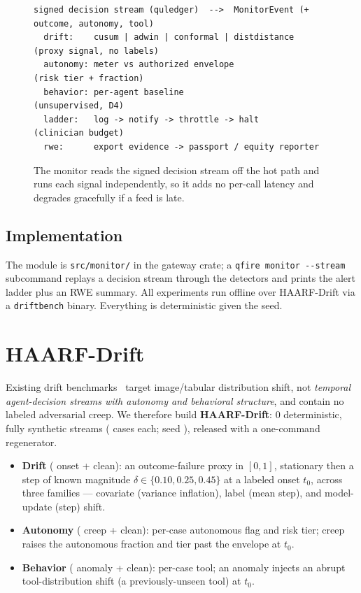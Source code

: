 \documentclass[11pt]{article}
\providecommand{\NumPrompts}{0}
\begin{document}
\begin{figure}[htb]\centering
\begin{tcolorbox}[policycard, cardcol=cardteal, title=The monitor as an off-hot-path
  consumer, width=0.86\linewidth]
\begin{lstlisting}[style=housespecyamlbare]
signed decision stream (quledger)  -->  MonitorEvent (+ outcome, autonomy, tool)
  drift:    cusum | adwin | conformal | distdistance   (proxy signal, no labels)
  autonomy: meter vs authorized envelope               (risk tier + fraction)
  behavior: per-agent baseline                         (unsupervised, D4)
  ladder:   log -> notify -> throttle -> halt          (clinician budget)
  rwe:      export evidence -> passport / equity reporter
\end{lstlisting}
\end{tcolorbox}
\caption{The monitor reads the signed decision stream off the hot path and runs each
signal independently, so it adds no per-call latency and degrades gracefully if a feed is
late.}
\label{fig:arch}
\end{figure}

\subsection{Implementation}
The module is \texttt{src/monitor/} in the gateway crate; a \texttt{qfire monitor
-{}-stream} subcommand replays a decision stream through the detectors and prints the alert
ladder plus an RWE summary. All experiments run offline over HAARF-Drift via a
\texttt{driftbench} binary. Everything is deterministic given the seed.

\section{HAARF-Drift}\label{sec:benchmark}
Existing drift benchmarks~\cite{koh2021wilds} target image/tabular distribution shift, not
\emph{temporal agent-decision streams with autonomy and behavioral structure}, and contain
no labeled adversarial creep. We therefore build \textbf{HAARF-Drift}: \NumPrompts{}
deterministic, fully synthetic streams (\StreamLen{} cases each; seed \Seed{}), released
with a one-command regenerator.

\begin{itemize}
  \item \textbf{Drift} (\DriftOnset{} onset + \DriftClean{} clean): an outcome-failure
  proxy in $[0,1]$, stationary then a step of known magnitude
  $\delta\in\{0.10,0.25,0.45\}$ at a labeled onset $t_0$, across three families ---
  covariate (variance inflation), label (mean step), and model-update (step) shift.
  \item \textbf{Autonomy} (\AutoCreep{} creep + \AutoClean{} clean): per-case autonomous
  flag and risk tier; creep raises the autonomous fraction and tier past the envelope at
  $t_0$.
  \item \textbf{Behavior} (\BehAnom{} anomaly + \BehClean{} clean): per-case tool; an
  anomaly injects an abrupt tool-distribution shift (a previously-unseen tool) at $t_0$.
\end{itemize}
\end{document}
